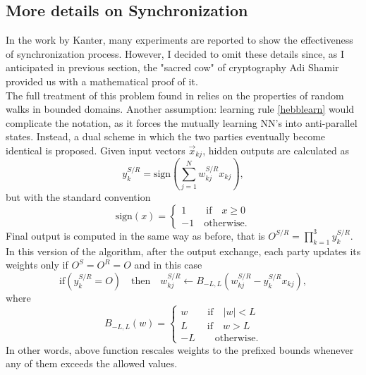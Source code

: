 \documentclass[%
    corpo=11pt,
    twoside,
    stile=classica,
    oldstyle,
    autoretitolo,
    tipotesi=magistrale,
    greek,
    evenboxes,
    english
]{toptesi}
\newcommand{\sign}{\text{sign}}
\begin{document}
\subsection{More details on Synchronization}
\label{ssc:synchro}
In the work by Kanter, many experiments are reported to show the effectiveness of synchronization process. However, I decided to omit these details since, as I anticipated in previous section, the "sacred cow" of cryptography Adi Shamir provided us with a mathematical proof of it. \\
The full treatment of this problem found in \cite{shamir} relies on the properties of random walks in bounded domains. Another assumption: learning rule \eqref{hebblearn} would complicate the notation, as it forces the mutually learning NN's into anti-parallel states. Instead, a dual scheme in which the two parties eventually become identical is proposed. Given input vectors $\vec{x}_{kj}$, hidden outputs are calculated as
\begin{equation}
y_k^{S/R} = \sign\left(\sum_{j=1}^{N}w_{kj}^{S/R}x_{kj}\right),
\end{equation}
but with the standard convention 
\begin{equation}
\sign(x) = \begin{cases}
1 \qquad \text{if} \quad x \geq 0 \\
-1 \quad \text{otherwise.}
\end{cases}
\end{equation}
Final output is computed in the same way as before, that is $O^{S/R} = \prod_{k=1}^{3}y_k^{S/R}$. In this version of the algorithm, after the output exchange, each party updates its weights only if $O^S=O^R=O$ and in this case 
\begin{equation}
\label{shamirlearn}
\text{if} \left(y_k^{S/R}=O\right) \quad \text{then} \quad 
w_{kj}^{S/R} \leftarrow B_{-L,L}\left(w_{kj}^{S/R} - y_k^{S/R}x_{kj}\right),
\end{equation}
where
\begin{equation}
\label{rebound}
B_{-L,L}(w) = \begin{cases}
w \qquad \text{if} \quad |w|<L \\
L \qquad \text{if} \quad w>L \\
-L \qquad \text{otherwise}.
\end{cases}
\end{equation}
In other words, above function rescales weights to the prefixed bounds whenever any of them exceeds the allowed values. \\
\end{document}
